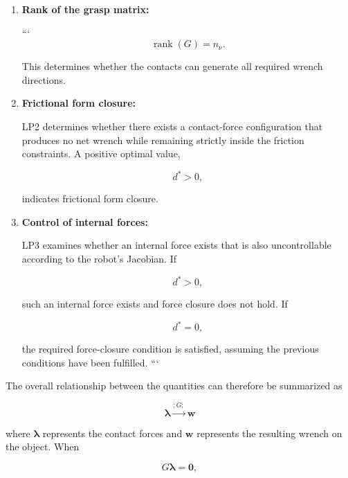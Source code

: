 \begin{enumerate}
\item \textbf{Rank of the grasp matrix:}

```
\begin{equation}
    \operatorname{rank}(G)=n_{\nu}.
\end{equation}

This determines whether the contacts can generate all required wrench directions.

\item \textbf{Frictional form closure:}

LP2 determines whether there exists a contact-force configuration that produces no net wrench while remaining strictly inside the friction constraints. A positive optimal value,

\begin{equation}
    d^*>0,
\end{equation}

indicates frictional form closure.

\item \textbf{Control of internal forces:}

LP3 examines whether an internal force exists that is also uncontrollable according to the robot's Jacobian. If

\begin{equation}
    d^*>0,
\end{equation}

such an internal force exists and force closure does not hold. If

\begin{equation}
    d^*=0,
\end{equation}

the required force-closure condition is satisfied, assuming the previous conditions have been fulfilled.
```

\end{enumerate}

The overall relationship between the quantities can therefore be summarized as

\begin{equation}
\boxed{
\boldsymbol{\lambda}
\xrightarrow{;G;}
\mathbf{w}
}
\end{equation}

where $\boldsymbol{\lambda}$ represents the contact forces and $\mathbf{w}$ represents the resulting wrench on the object. When

\begin{equation}
G\boldsymbol{\lambda}=\mathbf{0},
\end{equation}

